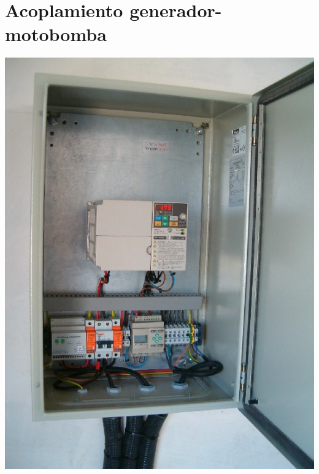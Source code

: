 \documentclass[xcolor={usenames,svgnames,dvipsnames}]{beamer}
\begin{document}
\section{Acoplamiento generador-motobomba}
\label{sec:org052be2c}

\begin{frame}[label={sec:orgcb1f0f2}]{}
\begin{center}
\includegraphics[height=0.9\textheight]{../figs/VariadorFrecuencia.jpg}
\end{center}
\end{frame}
\end{document}
